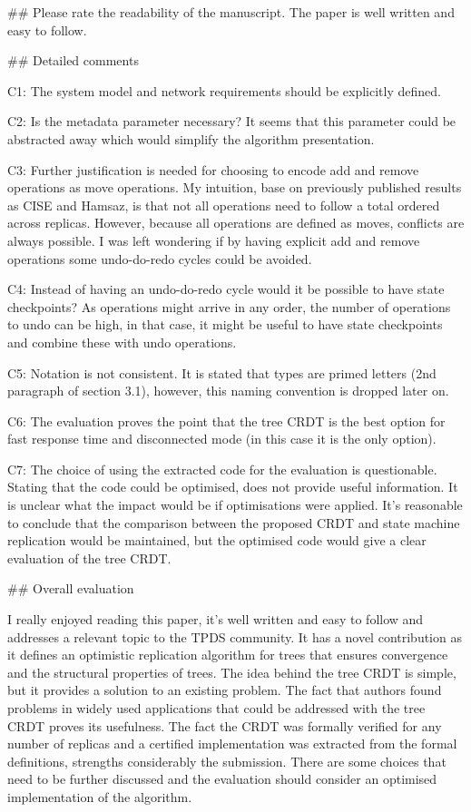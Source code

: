 \documentclass[10pt]{article}
\begin{document}
\begin{spverbatim}
## Please rate the readability of the manuscript.
The paper is well written and easy to follow.

## Detailed comments

C1: The system model and network requirements should be explicitly defined.

C2: Is the metadata parameter necessary? It seems that this parameter could be abstracted away which would simplify the algorithm presentation.

C3: Further justification is needed for choosing to encode add and remove operations as move operations. My intuition, base on previously published results as CISE and Hamsaz, is that not all operations need to follow a total ordered across replicas. However, because all operations are defined as moves, conflicts are always possible. I was left wondering if by having explicit add and remove operations some undo-do-redo cycles could be avoided.

C4: Instead of having an undo-do-redo cycle would it be possible to have state checkpoints? As operations might arrive in any order, the number of operations to undo can be high, in that case, it might be useful to have state checkpoints and combine these with undo operations.

C5: Notation is not consistent. It is stated that types are primed letters (2nd paragraph of section 3.1), however, this naming convention is dropped later on.

C6: The evaluation proves the point that the tree CRDT is the best option for fast response time and disconnected mode (in this case it is the only option).

C7: The choice of using the extracted code for the evaluation is questionable. Stating that the code could be optimised, does not provide useful information. It is unclear what the impact would be if optimisations were applied. It's reasonable to conclude that the comparison between the proposed CRDT and state machine replication would be maintained, but the optimised code would give a clear evaluation of the tree CRDT.

## Overall evaluation

I really enjoyed reading this paper, it's well written and easy to follow and addresses a relevant topic to the TPDS community.
It has a novel contribution as it defines an optimistic replication algorithm for trees that ensures convergence and the structural properties of trees. The idea behind the tree CRDT is simple, but it provides a solution to an existing problem. The fact that authors found problems in widely used applications that could be addressed with the tree CRDT proves its usefulness.
The fact the CRDT was formally verified for any number of replicas and a certified implementation was extracted from the formal definitions, strengths considerably the submission.
There are some choices that need to be further discussed and the evaluation should consider an optimised implementation of the algorithm.


\end{spverbatim}
\end{document}

